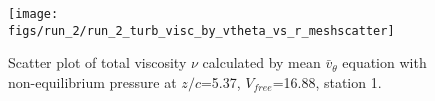 \begin{figure}[H]
\centering
\texttt{[image: figs/run\_2/run\_2\_turb\_visc\_by\_vtheta\_vs\_r\_meshscatter]}
\caption{Scatter plot of total viscosity $\nu$ calculated by mean $\bar{v}_{\theta}$ equation with non-equilibrium pressure at $z/c$=5.37, $V_{free}$=16.88, station 1.}
\label{fig:run_2_turb_visc_by_vtheta_vs_r_meshscatter}
\end{figure}


